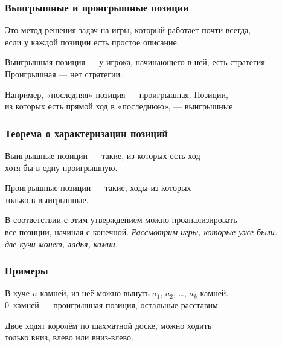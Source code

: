 \begin{frame} \frametitle{Выигрышные и проигрышные позиции}
Это метод решения задач на игры, который работает почти всегда, \\
если у каждой позиции есть простое описание. \bigskip

Выигрышная позиция — у игрока, начинающего в ней, есть стратегия. \\
Проигрышная — нет стратегии. \bigskip

Например, «последняя» позиция — проигрышная. Позиции, \\
из которых есть прямой ход в «последнюю», — выигрышные.
\end{frame}

\begin{frame} \frametitle{Теорема о характеризации позиций}

\begin{block}{\vspace*{-3ex}}
Выигрышные позиции — такие, из которых есть ход \\
хотя бы в одну проигрышную. \bigskip

Проигрышные позиции — такие, ходы из которых \\
только в выигрышные.\end{block}\bigskip

В соответствии с этим утверждением можно проанализировать \\
все позиции, начиная с конечной. {\it Рассмотрим игры, которые уже были:} \\
{\it две кучи монет, ладья, камни.}
\end{frame}

\begin{frame} \frametitle{Примеры}
В куче $n$ камней, из неё можно вынуть $a_1$, $a_2$, \ldots, $a_k$ камней. \\
0~камней — проигрышная позиция, остальные расставим. \pause

Двое ходят королём по шахматной доске, можно ходить \\
только вниз, влево или вниз-влево. \pause

\begin{center}  \end{center}
\end{frame}


